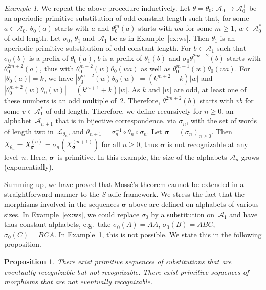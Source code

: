 \documentclass{amsart}
\newtheorem{proposition}[lemma]{Proposition}
\theoremstyle{definition}
\theoremstyle{remark}
\newtheorem{example}[lemma]{Example}
\numberwithin{equation}{section}
\begin{document}
\begin{example} \label{ex:ws2}
We repeat the above procedure inductively. 
Let $\theta = \theta_0:\, \mathcal{A}_0 \to \mathcal{A}_0^+$ be an aperiodic primitive substitution of odd constant length such that, for some $a \in \mathcal{A}_0$, $\theta_0(a)$ starts with $a$ and $\theta_0^m(a)$ starts with $wa$ for some $m \ge 1$, $w \in \mathcal{A}_0^*$ of odd length.
Let $\sigma_0$, $\theta_1$ and~$\mathcal{A}_1$ be as in Example~\ref{ex:ws}. 
Then $\theta_1$ is an aperiodic primitive substitution of odd constant length.
For $b \in \mathcal{A}_1$ such that $\sigma_0(b)$ is a prefix of $\theta_0(a)$, $b$ is a prefix of $\theta_1(b)$ and $\sigma_0 \theta_1^{2m+2}(b)$ starts with $\theta_0^{2m+2}(a)$, thus with $\theta_0^{m+2}(w) \theta_0(wa)$ as well as $\theta_0^{m+1}(w) \theta_0(wa)$. 
For $|\theta_0(a)| = k$, we have $|\theta_0^{m+2}(w) \theta_0(w)| = (k^{m+2}+k) |w|$ and $|\theta_0^{m+2}(w) \theta_0(w)| = (k^{m+1}+k) |w|$.
As $k$ and $|w|$ are odd, at least one of these numbers is an odd multiple of~$2$. 
Therefore, $\theta_1^{2m+2}(b)$ starts with $vb$ for some $v \in \mathcal{A}_1^*$ of odd length. 
Therefore, we define recursively for $n \ge 0$, an alphabet~$\mathcal{A}_{n+1}$ that is in bijective correspondence, via $\sigma_n$, with the set of words of length two in~$\mathcal{L}_{\theta_n}$, and $\theta_{n+1} = \sigma_n^{-1} \circ \theta_n \circ \sigma_n$.
Let $\boldsymbol{\sigma} = (\sigma_n)_{n\geq 0}$.
Then $X_{\theta_n} = X_{\boldsymbol{\sigma}}^{(n)} = \sigma_n(X_{\boldsymbol{\sigma}}^{(n+1)})$ for all $n \ge 0$, thus $\boldsymbol{\sigma}$ is not recognizable at any level~$n$. 
Here, $\boldsymbol{\sigma}$~is primitive.
In this example, the size of the alphabets $\mathcal{A}_n$ grows (exponentially).
\end{example}

Summing up, we have proved  that Moss\'e's theorem cannot be  extended in a straightforward manner to the $S$-adic framework.  We stress the fact that the morphisms involved in the sequences $\boldsymbol{\sigma}$ above are defined on alphabets of various sizes. 
In Example~\ref{ex:ws}, we could replace $\sigma_0$ by a substitution on~$\mathcal{A}_1$ and have thus constant alphabets, e.g.\ take $\sigma_0(A) = AA$, $\sigma_0(B) = ABC$, $\sigma_0(C) = BCA$.
In Example~\ref{ex:ws2}, this is not possible. 
We state this in the following proposition.

\begin{proposition} \label{prop:prim}
There exist primitive sequences of substitutions that are eventually recognizable but not recognizable.
There exist primitive sequences of morphisms that are not eventually recognizable.
\end{proposition}
\end{document}
